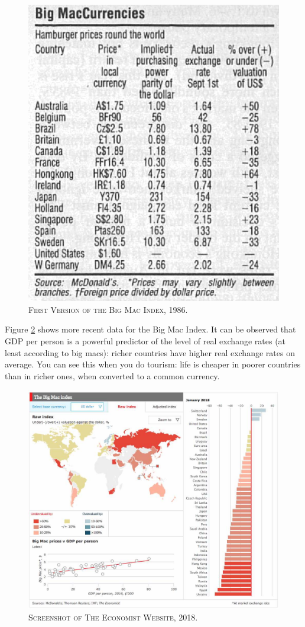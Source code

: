 \documentclass[]{book}
\begin{document}
\begin{figure}

{\centering \includegraphics[width=0.5\linewidth,height=1\textheight]{figures/big-mac-index-1986-economist} 

}

\caption{\textsc{First Version of the Big Mac Index,
1986}.}\label{fig:big-mac-economist-1986}
\end{figure}

Figure \ref{fig:big-mac-economist-now} shows more recent data for the
Big Mac Index. It can be observed that GDP per person is a powerful
predictor of the level of real exchange rates (at least according to big
macs): richer countries have higher real exchange rates on average. You
can see this when you do tourism: life is cheaper in poorer countries
than in richer ones, when converted to a common currency.




\begin{figure}

{\centering \includegraphics[width=1\linewidth,height=1\textheight]{figures/big-mac-index} 

}

\caption{\textsc{Screenshot of The Economist Website,
2018}.}\label{fig:big-mac-economist-now}
\end{figure}
\end{document}
